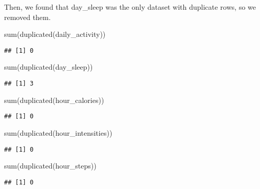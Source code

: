 \documentclass[
]{article}
\newenvironment{Shaded}{\begin{snugshade}}{\end{snugshade}}
\newcommand{\FunctionTok}[1]{\textcolor[rgb]{0.00,0.00,0.00}{#1}}
\newcommand{\NormalTok}[1]{#1}
\begin{document}
Then, we found that day\_sleep was the only dataset with duplicate rows,
so we removed them.

\begin{Shaded}
\begin{Highlighting}[]
\FunctionTok{sum}\NormalTok{(}\FunctionTok{duplicated}\NormalTok{(daily\_activity))}
\end{Highlighting}
\end{Shaded}

\begin{verbatim}
## [1] 0
\end{verbatim}

\begin{Shaded}
\begin{Highlighting}[]
\FunctionTok{sum}\NormalTok{(}\FunctionTok{duplicated}\NormalTok{(day\_sleep))}
\end{Highlighting}
\end{Shaded}

\begin{verbatim}
## [1] 3
\end{verbatim}

\begin{Shaded}
\begin{Highlighting}[]
\FunctionTok{sum}\NormalTok{(}\FunctionTok{duplicated}\NormalTok{(hour\_calories))}
\end{Highlighting}
\end{Shaded}

\begin{verbatim}
## [1] 0
\end{verbatim}

\begin{Shaded}
\begin{Highlighting}[]
\FunctionTok{sum}\NormalTok{(}\FunctionTok{duplicated}\NormalTok{(hour\_intensities))}
\end{Highlighting}
\end{Shaded}

\begin{verbatim}
## [1] 0
\end{verbatim}

\begin{Shaded}
\begin{Highlighting}[]
\FunctionTok{sum}\NormalTok{(}\FunctionTok{duplicated}\NormalTok{(hour\_steps))}
\end{Highlighting}
\end{Shaded}

\begin{verbatim}
## [1] 0
\end{verbatim}
\end{document}
